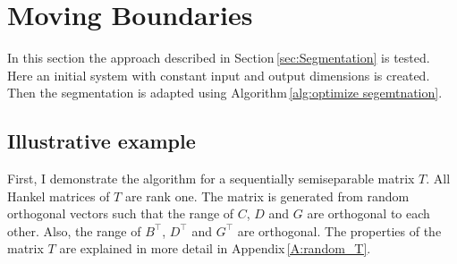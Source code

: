 \documentclass[numbers=noenddot,doctype=mastersthesis,BCOR=15mm,biblatex]{ldvbook}%
\begin{document}
\section{Moving Boundaries}\label{sec:axp_move}
In this section the approach described in Section\,\ref{sec:Segmentation} is tested.
Here an initial system with constant input and output dimensions is created.
Then the segmentation is adapted using Algorithm\,\ref{alg:optimize segemtnation}.

\subsection{Illustrative example}\label{sec:test_adao}
First, I demonstrate the algorithm for a sequentially semiseparable matrix $T$.
All Hankel matrices of $T$ are rank one. 
The matrix is generated from random orthogonal vectors such that the range of $C$, $D$ and $G$ are orthogonal to each other.
Also, the range of $B^\top$, $D^\top$ and $G^\top$ are orthogonal.
The properties of the matrix $T$ are explained in more detail in Appendix\,\ref{A:random_T}.
\end{document}
